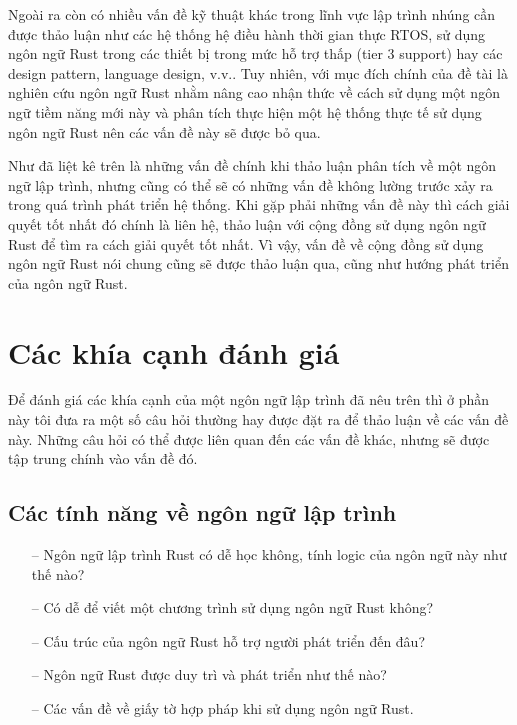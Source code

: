 Ngoài ra còn có nhiều vấn đề kỹ thuật khác trong lĩnh vực lập trình nhúng cần được thảo luận như các hệ thống hệ điều hành thời gian thực RTOS, sử dụng ngôn ngữ Rust trong các thiết bị trong mức hỗ trợ thấp (tier 3 support) hay các design pattern, language design, v.v..
Tuy nhiên, với mục đích chính của đề tài là nghiên cứu ngôn ngữ Rust nhằm nâng cao nhận thức về cách sử dụng một ngôn ngữ tiềm năng mới này và phân tích thực hiện một hệ thống thực tế sử dụng ngôn ngữ Rust nên các vấn đề này sẽ được bỏ qua.

Như đã liệt kê trên là những vấn đề chính khi thảo luận phân tích về một ngôn ngữ lập trình, nhưng cũng có thể sẽ có những vấn đề không lường trước xảy ra trong quá trình phát triển hệ thống.
Khi gặp phải những vấn đề này thì cách giải quyết tốt nhất đó chính là liên hệ, thảo luận với cộng đồng sử dụng ngôn ngữ Rust để tìm ra cách giải quyết tốt nhất.
Vì vậy, vấn đề về cộng đồng sử dụng ngôn ngữ Rust nói chung cũng sẽ được thảo luận qua, cũng như hướng phát triển của ngôn ngữ Rust.

\section{Các khía cạnh đánh giá}
Để đánh giá các khía cạnh của một ngôn ngữ lập trình đã nêu trên thì ở phần này tôi đưa ra một số câu hỏi thường hay được đặt ra để thảo luận về các vấn đề này. Những câu hỏi có thể được liên quan đến các vấn đề khác, nhưng sẽ được tập trung chính vào vấn đề đó.
\subsection{Các tính năng về ngôn ngữ lập trình}
\begin{itemize}
    \item[--] Ngôn ngữ lập trình Rust có dễ học không, tính logic của ngôn ngữ này như thế nào?
    \item[--] Có dễ để viết một chương trình sử dụng ngôn ngữ Rust không?
    \item[--] Cấu trúc của ngôn ngữ Rust hỗ trợ người phát triển đến đâu?
    \item[--] Ngôn ngữ Rust được duy trì và phát triển như thế nào?
    \item[--] Các vấn đề về giấy tờ hợp pháp khi sử dụng ngôn ngữ Rust.
\end{itemize}

